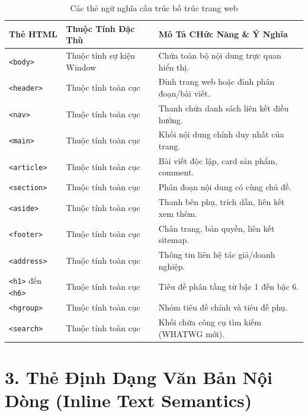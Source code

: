 \documentclass[11pt,oneside]{book}
\newcommand{\codeinline}[1]{\textcolor{accentOrange}{\texttt{#1}}}
\begin{document}
\begin{table}[H]
\centering
\begin{prettyTableBox}
\small
{}
\begin{tabularx}{\linewidth}{lp{3.5cm}X}
\rowcolor{primaryBlue}
\color{white}\textbf{Thẻ HTML} & \color{white}\textbf{Thuộc Tính Đặc Thù} & \color{white}\textbf{Mô Tả CHức Năng \& Ý Nghĩa} \\
\hline
\codeinline{<body>} & Thuộc tính sự kiện Window & Chứa toàn bộ nội dung trực quan hiển thị. \\
\codeinline{<header>} & Thuộc tính toàn cục & Đỉnh trang web hoặc đỉnh phân đoạn/bài viết. \\
\codeinline{<nav>} & Thuộc tính toàn cục & Thanh chứa danh sách liên kết điều hướng. \\
\codeinline{<main>} & Thuộc tính toàn cục & Khối nội dung chính duy nhất của trang. \\
\codeinline{<article>} & Thuộc tính toàn cục & Bài viết độc lập, card sản phẩm, comment. \\
\codeinline{<section>} & Thuộc tính toàn cục & Phân đoạn nội dung có cùng chủ đề. \\
\codeinline{<aside>} & Thuộc tính toàn cục & Thanh bên phụ, trích dẫn, liên kết xem thêm. \\
\codeinline{<footer>} & Thuộc tính toàn cục & Chân trang, bản quyền, liên kết sitemap. \\
\codeinline{<address>} & Thuộc tính toàn cục & Thông tin liên hệ tác giả/doanh nghiệp. \\
\codeinline{<h1>} đến \codeinline{<h6>} & Thuộc tính toàn cục & Tiêu đề phân tầng từ bậc 1 đến bậc 6. \\
\codeinline{<hgroup>} & Thuộc tính toàn cục & Nhóm tiêu đề chính và tiêu đề phụ. \\
\codeinline{<search>} & Thuộc tính toàn cục & Khối chứa công cụ tìm kiếm (WHATWG mới). \\
\end{tabularx}
\end{prettyTableBox}
\vspace{-2pt}
\caption{Các thẻ ngữ nghĩa cấu trúc bố trúc trang web}
\end{table}

\section{3. Thẻ Định Dạng Văn Bản Nội Dòng (Inline Text Semantics)}
\end{document}
